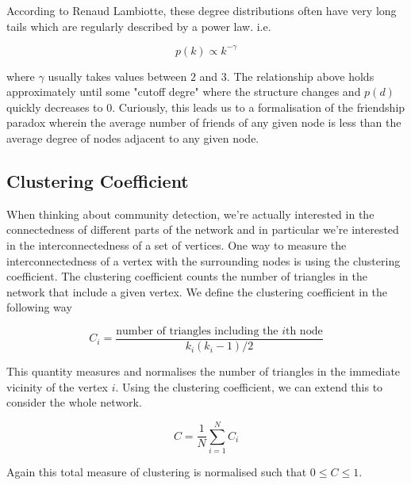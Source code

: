 According to Renaud Lambiotte, these degree distributions often have very long tails which are regularly described by a power law. i.e.

$$ p(k) \propto k^{-\gamma} $$

where $\gamma$ usually takes values between $2$ and $3$.\cite[16]{oxford:renaud_notes} The relationship above holds approximately until some "cutoff degre" where the structure changes and $p(d)$ quickly decreases to $0$. Curiously, this leads us to a formalisation of the friendship paradox wherein the average number of friends of any given node is less than the average degree of nodes adjacent to any given node.



\subsection{Clustering Coefficient}
When thinking about community detection, we're actually interested in the connectedness of different parts of the network and in particular we're interested in the interconnectedness of a set of vertices. One way to measure the interconnectedness of a vertex with the surrounding nodes is using the clustering coefficient. The clustering coefficient counts the number of triangles in the network that include a given vertex. We define the clustering coefficient in the following way

$$ C_i = \frac{\text{number of triangles including the }i\text{th node}}{k_i(k_i-1)/2} $$

This quantity measures and normalises the number of triangles in the immediate vicinity of the vertex $i$. Using the clustering coefficient, we can extend this to consider the whole network.

$$ C = \frac{1}{N}\sum_{i=1}^NC_i $$

Again this total measure of clustering is normalised such that $0 \leq C \leq 1$.

